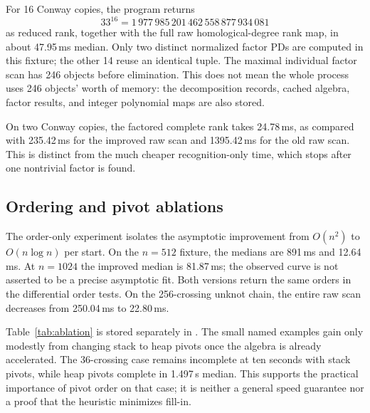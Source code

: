 \documentclass[11pt,a4paper]{article}
\theoremstyle{definition}\newtheorem{remark}[theorem]{Remark}
\begin{document}
For 16 Conway copies, the program returns
\[
33^{16}=1\,977\,985\,201\,462\,558\,877\,934\,081
\]
as reduced rank, together with the full raw homological-degree rank map, in
about 47.95\,ms median. Only two distinct normalized factor PDs are computed
in this fixture; the other 14 reuse an identical tuple. The maximal individual
factor scan has 246 objects before elimination. This does not mean the whole
process uses 246 objects' worth of memory: the decomposition records, cached
algebra, factor results, and integer polynomial maps are also stored.

On two Conway copies, the factored complete rank takes 24.78\,ms, as compared
with 235.42\,ms for the improved raw scan and 1395.42\,ms for the old raw scan.
This is distinct from the much cheaper recognition-only time, which stops after
one nontrivial factor is found.

\subsection{Ordering and pivot ablations}
\begin{table}[htbp]
\centering\small

\caption{Order construction alone on the closure of
$\sigma_1\cdots\sigma_n$. Both algorithms return the same chosen order.
These timings include all sampled greedy starts, but not a homology scan.}
\label{tab:order}
\end{table}

The order-only experiment isolates the asymptotic improvement from
$O(n^2)$ to $O(n\log n)$ per start. On the $n=512$ fixture, the medians are
891\,ms and 12.64\,ms. At $n=1024$ the improved median is 81.87\,ms;
the observed curve is not asserted to be a precise asymptotic fit. Both
versions return the same orders in the differential order tests. On the
256-crossing unknot chain, the entire raw scan decreases from 250.04\,ms
to 22.80\,ms.

\begin{table}[htbp]
\centering\small

\caption{Pivot ablation: both columns use the new cached algebra and order
routine. Fresh processes, median of three successful samples, ten-second
limit for the censored stack case.}
\label{tab:ablation}
\end{table}

Table~\ref{tab:ablation} is stored separately in
. The small named examples gain only modestly
from changing stack to heap pivots once the algebra is already accelerated.
The 36-crossing case remains incomplete at ten seconds with stack pivots, while
heap pivots complete in 1.497\,s median. This supports the practical importance
of pivot order on that case; it is neither a general speed guarantee nor a proof
that the heuristic minimizes fill-in.
\end{document}
